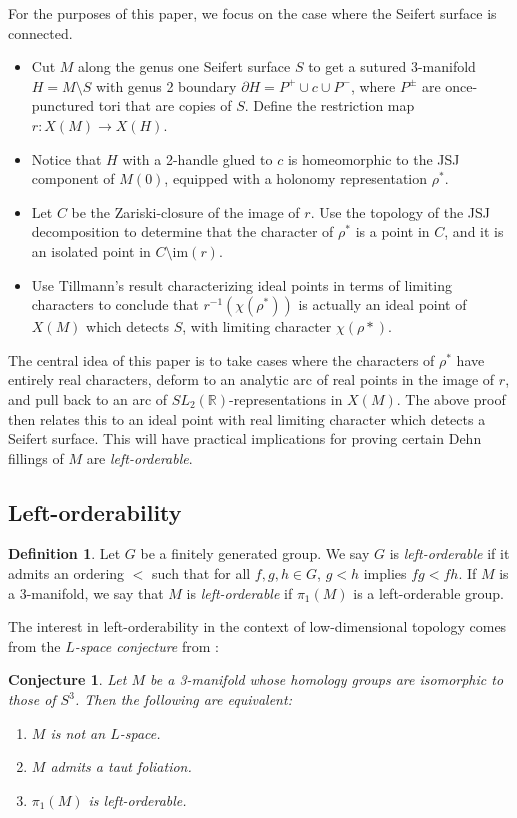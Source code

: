 \documentclass{article}
\theoremstyle{plain}
\theoremstyle{definition}
\newtheorem{definition}[theorem]{Definition}
\theoremstyle{plain}
\theoremstyle{plain}
\theoremstyle{plain}
\theoremstyle{remark}
\theoremstyle{remark}
\theoremstyle{plain}
\newtheorem{conjecture}[theorem]{Conjecture}
\theoremstyle{plain}
\begin{document}
For the purposes of this paper, we focus on the case where the Seifert surface is connected. 
\begin{itemize}
	\item Cut $M$ along the genus one Seifert surface $S$ to get a sutured 3-manifold $H = M \setminus S$ with genus 2 boundary $\partial H = P^+ \cup c \cup P^-$, where $P^\pm$ are once-punctured tori that are copies of $S$. Define the restriction map $r: X(M) \to X(H)$.
	\item Notice that $H$ with a 2-handle glued to $c$ is homeomorphic to the JSJ component of $M(0)$, equipped with a holonomy representation $\rho^*$.
	\item Let $C$ be the Zariski-closure of the image of $r$. Use the topology of the JSJ decomposition to determine that the character of $\rho^*$ is a point in $C$, and it is an isolated point in $C \setminus \text{im}(r)$. 
	\item Use Tillmann's result \cite{tillmann} characterizing ideal points in terms of limiting characters to conclude that $r^{-1}(\chi(\rho^*))$ is actually an ideal point of $X(M)$ which detects $S$, with limiting character $\chi(\rho*)$. 
\end{itemize}
The central idea of this paper is to take cases where the characters of $\rho^*$ have entirely real characters, deform to an analytic arc of real points in the image of $r$, and pull back to an arc of $SL_2(\mathbb{R})$-representations in $X(M)$. The above proof then relates this to an ideal point with real limiting character which detects a Seifert surface. This will have practical implications for proving certain Dehn fillings of $M$ are \emph{left-orderable}. 

\subsection{Left-orderability}

\begin{definition}
Let $G$ be a finitely generated group. We say $G$ is \emph{left-orderable} if it admits an ordering $<$ such that for all $f, g, h \in G$, $g < h$ implies $fg < fh$. If $M$ is a 3-manifold, we say that $M$ is \emph{left-orderable} if $\pi_1(M)$ is a left-orderable group.
\end{definition}

The interest in left-orderability in the context of low-dimensional topology comes from the \emph{$L$-space conjecture} from \cite{bgw}:

\begin{conjecture}
Let $M$ be a 3-manifold whose homology groups are isomorphic to those of $S^3$. Then the following are equivalent:
\begin{enumerate}
	\item $M$ is not an $L$-space.
	\item $M$ admits a taut foliation.
	\item $\pi_1(M)$ is left-orderable.
\end{enumerate}
\end{conjecture}
\end{document}
